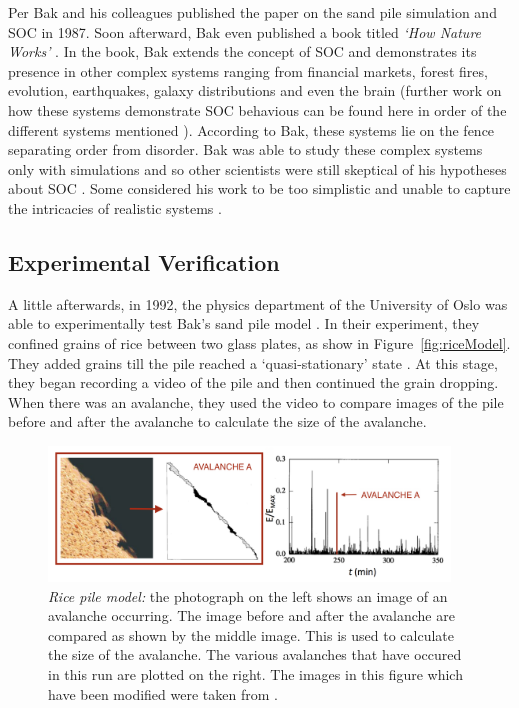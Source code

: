 \documentclass{book}
\begin{document}
Per Bak and his colleagues published the paper on the sand pile simulation and SOC in 1987. Soon afterward, Bak even published a book titled \textit{`How Nature Works'} \cite{howNatureWorks}. In the book, Bak extends the concept of SOC and demonstrates its presence in other complex systems ranging from financial markets,  forest fires, evolution, earthquakes, galaxy distributions and even the brain \cite{howNatureWorks} (further work on how these systems demonstrate SOC behavious can be found here in order of the different systems mentioned \cite{stockMarketProof, ForestFireProof,evolutionProof,EarthquakesProof,galaxyFormationProof,BrainProof}). According to Bak, these systems lie on the fence separating order from disorder. Bak was able to study these complex systems only with simulations and so other scientists were still skeptical of his hypotheses about SOC \cite{MindSandWeb}. Some considered his work to be too simplistic and unable to capture the intricacies of realistic systems \cite{MindSandWeb}. 
\subsection{Experimental Verification}
A little afterwards, in 1992, the physics department of the University of Oslo was able to experimentally test Bak's sand pile model \cite{riceExpt}. In their experiment, they confined grains of rice between two glass plates, as show in Figure~\ref{fig:riceModel}. They added grains till the pile reached a `quasi-stationary' state \cite{riceExpt}. At this stage, they began recording a video of the pile and then continued the grain dropping. When there was an avalanche, they used the video to compare images of the pile before and after the avalanche to calculate the size of the avalanche. 
\begin{figure}[h]
	\centering
	\includegraphics[width=0.95\textwidth]{Figures/Intro/riceFigs/riceEvent}
	\caption[Rice-pile Model]{
\textit{Rice pile model:} the photograph on the left shows an image of an avalanche occurring. The image before and after the avalanche are compared as shown by the middle image. This is used to calculate the size of the avalanche. The various avalanches that have occured in this run are plotted on the right. The images in this figure which have been modified were taken from \cite{riceExpt}. 
}
	\label{fig:perBak_cellular}
\end{figure}
\end{document}
